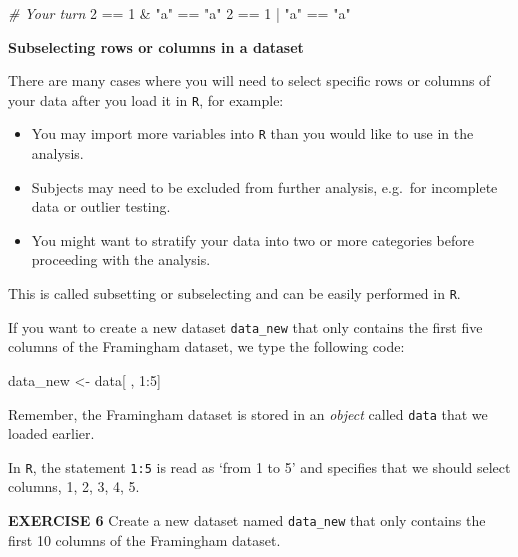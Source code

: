 \documentclass[
]{article}
\newenvironment{Shaded}{\begin{snugshade}}{\end{snugshade}}
\newcommand{\CommentTok}[1]{\textcolor[rgb]{0.56,0.35,0.01}{\textit{#1}}}
\newcommand{\DecValTok}[1]{\textcolor[rgb]{0.00,0.00,0.81}{#1}}
\newcommand{\NormalTok}[1]{#1}
\newcommand{\OtherTok}[1]{\textcolor[rgb]{0.56,0.35,0.01}{#1}}
\newcommand{\SpecialCharTok}[1]{\textcolor[rgb]{0.00,0.00,0.00}{#1}}
\newcommand{\StringTok}[1]{\textcolor[rgb]{0.31,0.60,0.02}{#1}}
\begin{document}
\begin{Shaded}
\begin{Highlighting}[]
\CommentTok{\# Your turn}
\DecValTok{2} \SpecialCharTok{==} \DecValTok{1} \SpecialCharTok{\&} \StringTok{"a"} \SpecialCharTok{==} \StringTok{"a"}
\DecValTok{2} \SpecialCharTok{==} \DecValTok{1} \SpecialCharTok{|} \StringTok{"a"} \SpecialCharTok{==} \StringTok{"a"}
\end{Highlighting}
\end{Shaded}

\textbf{Subselecting rows or columns in a dataset}

There are many cases where you will need to select specific rows or
columns of your data after you load it in \texttt{R}, for example:

\begin{itemize}
\item
  You may import more variables into \texttt{R} than you would like to
  use in the analysis.
\item
  Subjects may need to be excluded from further analysis, e.g.~for
  incomplete data or outlier testing.
\item
  You might want to stratify your data into two or more categories
  before proceeding with the analysis.
\end{itemize}

This is called subsetting or subselecting and can be easily performed in
\texttt{R}.

If you want to create a new dataset \texttt{data\_new} that only
contains the first five columns of the Framingham dataset, we type the
following code:

\begin{Shaded}
\begin{Highlighting}[]
\NormalTok{data\_new }\OtherTok{\textless{}{-}}\NormalTok{ data[ , }\DecValTok{1}\SpecialCharTok{:}\DecValTok{5}\NormalTok{]}
\end{Highlighting}
\end{Shaded}

Remember, the Framingham dataset is stored in an \emph{object} called
\texttt{data} that we loaded earlier.

In \texttt{R}, the statement \texttt{1:5} is read as `from 1 to 5' and
specifies that we should select columns, 1, 2, 3, 4, 5.

\textbf{EXERCISE 6} Create a new dataset named \texttt{data\_new} that
only contains the first 10 columns of the Framingham dataset.
\end{document}
